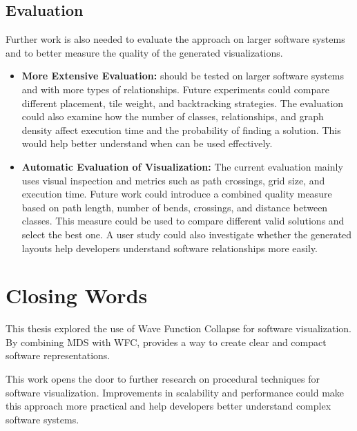 \documentclass[../main.tex]{subfiles}
\begin{document}
\subsection{Evaluation}

Further work is also needed to evaluate the approach on larger software systems and to better measure the quality of the generated visualizations.

\begin{itemize}
    \item \textbf{More Extensive Evaluation:} \wassis should be tested on larger software systems and with more types of relationships. Future experiments could compare different placement, tile weight, and backtracking strategies. The evaluation could also examine how the number of classes, relationships, and graph density affect execution time and the probability of finding a solution. This would help better understand when \wassis can be used effectively.

    \item \textbf{Automatic Evaluation of Visualization:} The current evaluation mainly uses visual inspection and metrics such as path crossings, grid size, and execution time. Future work could introduce a combined quality measure based on path length, number of bends, crossings, and distance between classes. This measure could be used to compare different valid solutions and select the best one. A user study could also investigate whether the generated layouts help developers understand software relationships more easily.
\end{itemize}


\section{Closing Words}
This thesis explored the use of Wave Function Collapse for software visualization. By combining MDS with WFC, \wassis provides a way to create clear and compact software representations.

This work opens the door to further research on procedural techniques for software visualization. Improvements in scalability and performance could make this approach more practical and help developers better understand complex software systems.
\end{document}
